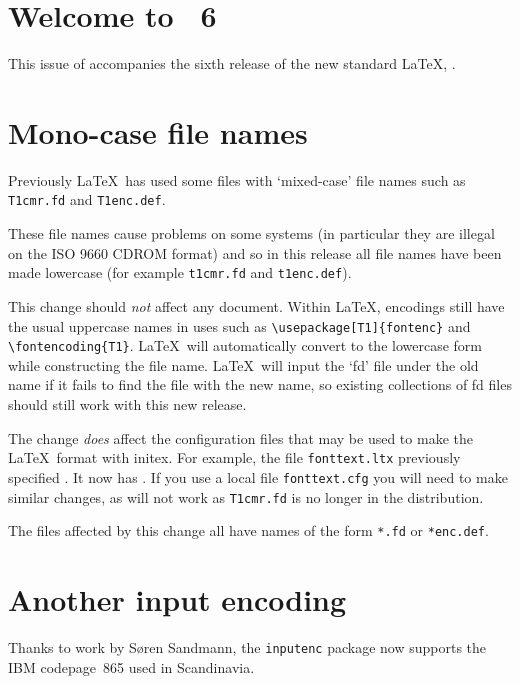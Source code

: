 \documentclass{ltnews}
\providecommand\pkg[1]{\texttt{#1}}
\providecommand\file[1]{\texttt{#1}}
\begin{document}
\maketitle

\section{Welcome to \LaTeXNews~6}
This  issue of \emph{\LaTeXNews} accompanies the sixth release of the
new standard \LaTeX{}, \LaTeXe.

\section{Mono-case file names}
Previously \LaTeX\ has used some files with `mixed-case' file names
such as \file{T1cmr.fd} and \file{T1enc.def}.

These file names cause problems on some systems (in particular they
are illegal on the ISO 9660 CDROM format) and so in this release
all file names have been made lowercase (for example
\file{t1cmr.fd} and \file{t1enc.def}).

This change should \emph{not} affect any document. Within \LaTeX,
encodings still have the usual uppercase names in uses such as
\verb|\usepackage[T1]{fontenc}| and \verb|\fontencoding{T1}|.
\LaTeX\ will automatically convert to the lowercase form while
constructing the file name.
\LaTeX\ will input the `fd' file under the old name if it fails to
find the file with the new name, so existing collections of fd files
should still work with this new release.

The change \emph{does} affect the configuration files that may be used
to make the \LaTeX\ format with initex. For example, the file
\file{fonttext.ltx} previously specified \verb||.
It now has \verb||.
If you use a local file \file{fonttext.cfg}
you will need to make similar changes, as \verb||
will not work as \file{T1cmr.fd} is no longer in the distribution.

The files affected by this change all have names of the form
\verb|*.fd| or \verb|*enc.def|.

\section{Another input encoding}
Thanks to work by S\o ren Sandmann, the \pkg{inputenc} package now
supports the IBM codepage~865 used in Scandinavia.
\end{document}
